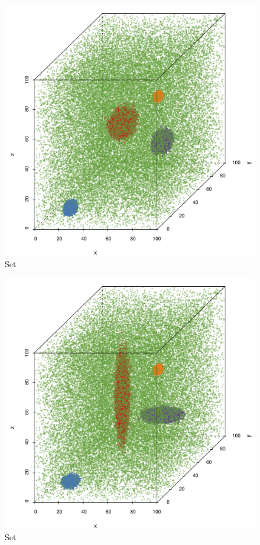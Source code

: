 \begin{subfigure}{0.23\textwidth}
	\centering
	\includegraphics[width=\textwidth]{experiment/img/datasetplot_ferdosi_3_120000}
	\caption{Set \ferdosiThree}
	\label{fig:3:simulated:datasets:ferdosi3}
\end{subfigure}			
\begin{subfigure}{0.23\textwidth}
	\centering
	\includegraphics[width=\textwidth]{experiment/img/datasetplot_baakman_3_120000}
	\caption{Set \baakmanThree}
	\label{fig:3:simulated:datasets:baakman3}
\end{subfigure}
